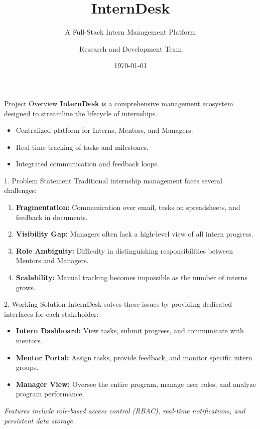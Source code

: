 \documentclass[10pt]{beamer}
\title{InternDesk}
\subtitle{A Full-Stack Intern Management Platform}
\author{Research and Development Team}
\date{\today}
\institute{Advanced Software Engineering Lab}
\begin{document}
\begin{frame}
    \titlepage
\end{frame}

\begin{frame}{Project Overview}
    \textbf{InternDesk} is a comprehensive management ecosystem designed to streamline the lifecycle of internships. 
    \vspace{0.5cm}
    \begin{itemize}
        \item Centralized platform for Interns, Mentors, and Managers.
        \item Real-time tracking of tasks and milestones.
        \item Integrated communication and feedback loops.
    \end{itemize}
\end{frame}

\begin{frame}{1. Problem Statement}
    Traditional internship management faces several challenges:
    \vspace{0.5cm}
    \begin{enumerate}
        \item \textbf{Fragmentation:} Communication over email, tasks on spreadsheets, and feedback in documents.
        \item \textbf{Visibility Gap:} Managers often lack a high-level view of all intern progress.
        \item \textbf{Role Ambiguity:} Difficulty in distinguishing responsibilities between Mentors and Managers.
        \item \textbf{Scalability:} Manual tracking becomes impossible as the number of interns grows.
    \end{enumerate}
\end{frame}

\begin{frame}{2. Working Solution}
    InternDesk solves these issues by providing dedicated interfaces for each stakeholder:
    \vspace{0.3cm}
    \begin{itemize}
        \item \textbf{Intern Dashboard:} View tasks, submit progress, and communicate with mentors.
        \item \textbf{Mentor Portal:} Assign tasks, provide feedback, and monitor specific intern groups.
        \item \textbf{Manager View:} Oversee the entire program, manage user roles, and analyze program performance.
    \end{itemize}
    \vspace{0.3cm}
    \textit{Features include role-based access control (RBAC), real-time notifications, and persistent data storage.}
\end{frame}
\end{document}
